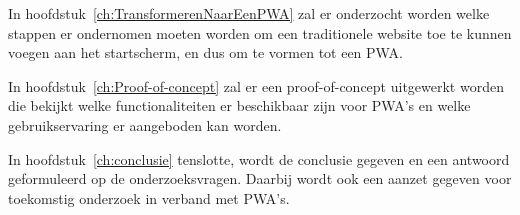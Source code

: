 	In hoofdstuk~\ref{ch:TransformerenNaarEenPWA} zal er onderzocht worden welke stappen er ondernomen moeten worden om een traditionele website toe te kunnen voegen aan het startscherm, en dus om te vormen tot een PWA.
	
	In hoofdstuk~\ref{ch:Proof-of-concept} zal er een proof-of-concept uitgewerkt worden die bekijkt welke functionaliteiten er beschikbaar zijn voor PWA's en welke gebruikservaring er aangeboden kan worden. 
	
	In hoofdstuk~\ref{ch:conclusie} tenslotte, wordt de conclusie gegeven en een antwoord geformuleerd op de onderzoeksvragen. Daarbij wordt ook een aanzet gegeven voor toekomstig onderzoek in verband met PWA's.






